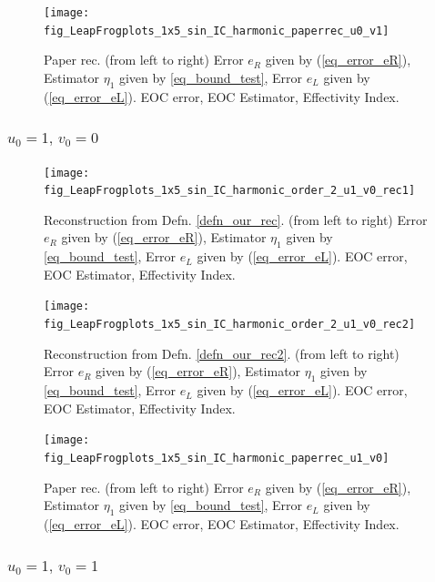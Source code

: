 \documentclass[12pt,a4paper]{article}
\numberwithin{equation}{section}
\theoremstyle{definition}
\begin{document}
\begin{figure}[H]
	\hspace{-3cm}
	\texttt{[image: fig\_LeapFrogplots\_1x5\_sin\_IC\_harmonic\_paperrec\_u0\_v1]}	
	\caption{Paper rec.  (from left to right) Error $e_R$ given by (\ref{eq_error_eR}), Estimator $\eta_1$ given by \ref{eq_bound_test}, Error $e_L$ given by  (\ref{eq_error_eL}). EOC error, EOC Estimator, Effectivity Index.}
	\label{fig_all_in_one_paper_rec_2_u0_v1}
\end{figure}

\subsubsection{$u_0=1,\, v_0=0$}
\begin{figure}[H]
	\hspace{-3cm}
	\texttt{[image: fig\_LeapFrogplots\_1x5\_sin\_IC\_harmonic\_order\_2\_u1\_v0\_rec1]}	
	\caption{Reconstruction from Defn. \ref{defn_our_rec}. (from left to right) Error $e_R$ given by (\ref{eq_error_eR}), Estimator $\eta_1$ given by \ref{eq_bound_test}, Error $e_L$ given by  (\ref{eq_error_eL}). EOC error, EOC Estimator, Effectivity Index.}
	\label{fig_all_in_one_our_rec_1_u1_v0}
\end{figure}

\begin{figure}[H]
	\hspace{-3cm}
	\texttt{[image: fig\_LeapFrogplots\_1x5\_sin\_IC\_harmonic\_order\_2\_u1\_v0\_rec2]}	
	\caption{Reconstruction from Defn. \ref{defn_our_rec2}. (from left to right) Error $e_R$ given by (\ref{eq_error_eR}), Estimator $\eta_1$ given by \ref{eq_bound_test}, Error $e_L$ given by  (\ref{eq_error_eL}). EOC error, EOC Estimator, Effectivity Index.}
	\label{fig_all_in_one_our_rec_2_u1_v0}
\end{figure}

\begin{figure}[H]
	\hspace{-3cm}
	\texttt{[image: fig\_LeapFrogplots\_1x5\_sin\_IC\_harmonic\_paperrec\_u1\_v0]}	
	\caption{Paper rec.  (from left to right) Error $e_R$ given by (\ref{eq_error_eR}), Estimator $\eta_1$ given by \ref{eq_bound_test}, Error $e_L$ given by  (\ref{eq_error_eL}). EOC error, EOC Estimator, Effectivity Index.}
	\label{fig_all_in_one_paper_rec_2_u1_v0}
\end{figure}


\subsubsection{$u_0=1,\, v_0=1$}
\end{document}
